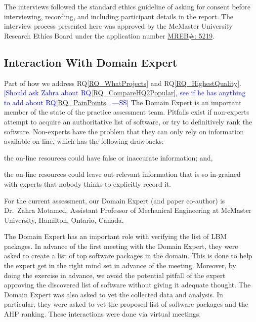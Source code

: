 \documentclass[final, 3p, times, authoryear]{elsarticle}
\newcommand{\authornote}[3]{\textcolor{#1}{[#3 ---#2]}}
\newcommand{\authornote}[3]{}
\newcommand{\wss}[1]{\authornote{blue}{SS}{#1}} %
\newcommand{\rqref}[1]{RQ\ref{#1}}
\begin{document}
The interviews followed the standard ethics guideline of asking for consent
before interviewing, recording, and including participant details in the report.
The interview process presented here was approved by the McMaster University
Research Ethics Board under the application number 
\href{https://github.com/smiths/AIMSS/blob/master/StateOfPractice/MACREM/Application.pdf}
{MREB\#: 5219}.

\subsection{Interaction With Domain Expert} \label{sec_vet_software_list}

Part of how we address \rqref{RQ_WhatProjects} and \rqref{RQ_HighestQuality}.
\wss{Should ask Zahra about \rqref{RQ_CompareHQ2Popular}, see if he has anything
to add about \rqref{RQ_PainPoints}.} The Domain Expert is an important member of
the state of the practice assessment team. Pitfalls exist if non-experts attempt
to acquire an authoritative list of software, or try to definitively rank the
software. Non-experts have the problem that they can only rely on information
available on-line, which has the following drawbacks:
\begin{inparaenum}[i)]
  \item the on-line resources could have false or inaccurate information; and,
  \item the on-line resources could leave out relevant information that is so
in-grained with experts that nobody thinks to explicitly record it.
\end{inparaenum}
For the current assessment, our Domain Expert (and paper co-author) is Dr.\
Zahra Motamed, Assistant Professor of Mechanical Engineering at McMaster
University, Hamilton, Ontario, Canada.  

The Domain Expert has an important role with verifying the list of LBM packages.
In advance of the first meeting with the Domain Expert, they were asked to
create a list of top software packages in the domain.  This is done to help the
expert get in the right mind set in advance of the meeting.  Moreover, by doing
the exercise in advance, we avoid the potential pitfall of the expert approving
the discovered list of software without giving it adequate thought.  The Domain
Expert was also asked to vet the collected data and analysis.  In particular,
they were asked to vet the proposed list of software packages and the AHP
ranking.  These interactions were done via virtual meetings.
\end{document}
